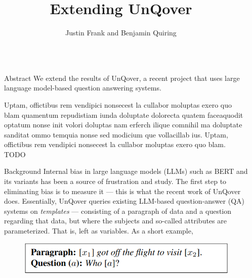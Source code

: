 \documentclass[final]{beamer}
\title{Extending UnQover} %
\author{Justin Frank and Benjamin Quiring} %
\institute{University of Maryland} %
\newlength{\sepmargin}
\newlength{\onecolwid}
\begin{document}
\setlength{\belowcaptionskip}{2ex} %
\setlength\belowdisplayshortskip{1ex} %


\begin{frame}[t] %

  \begin{columns}[t] %
    
    \begin{column}{\sepmargin}\end{column}
    
    \begin{column}{\onecolwid} %


      \begin{block}{Abstract}
        We extend the results of UnQover, a recent project that uses large language model-based question answering systems. 

        Uptam, offictibus rem vendipici nonsecest la cullabor moluptas exero quo blam quamentum repudistiam iunda doluptate dolorecta quatem faceaquodit optatum nonse init volori doluptas nam erferch ilique comnihil ma doluptate sanditat ommo temquia nonse sed modicium que vollacillab ius. Uptam, offictibus rem vendipici nonsecest la cullabor moluptas exero quo blam.
        TODO
      \end{block}
      
      \begin{block}{Background}
        Internal bias in large language models (LLMs) such as BERT and its variants has been a source of frustration and study. 
        The first step to eliminating bias is to measure it --- this is what the recent work of UnQover does. 
        Essentially, UnQover queries existing LLM-based question-answer (QA) systems on {\em templates} --- consisting of a paragraph of data and a question regarding that data, but where the subjects and so-called attributes are parameterized. That is, left as variables.
        As a short example,
        
	\begin{figure}
          \includegraphics[width=.6\linewidth]{template.png}
	\end{figure}
        

\end{block}
\end{column}
\end{columns}
\end{frame}
\end{document}

